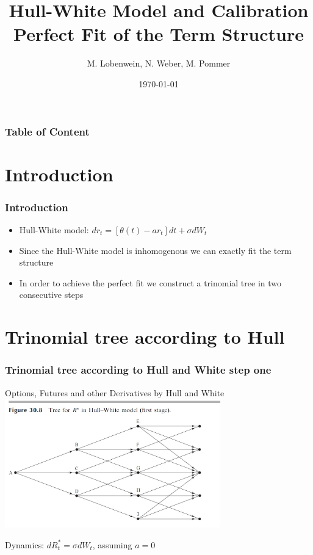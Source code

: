 \documentclass{beamer}
\begin{document}
\title[Hull-White model and calibration]{Hull-White Model and Calibration\\
Perfect Fit of the Term Structure}  



\date{\today} 
\author{M. Lobenwein, N. Weber, M. Pommer}



\begin{frame}
\titlepage
\end{frame} 


\begin{frame}
\frametitle[Table of Content]{Table of Content}
\vspace{0.4cm}
\tableofcontents
\end{frame} 


\section{Introduction} 
\begin{frame}
\frametitle{Introduction} 
\begin{itemize}
\item Hull-White model: $dr_t = [\theta(t)-ar_t]dt + \sigma dW_t$
\item Since the Hull-White model is inhomogenous we can exactly fit the term structure
\item In order to achieve the perfect fit we construct a trinomial tree in two consecutive steps
\end{itemize}
\end{frame}


\section{Trinomial tree according to Hull} 
\begin{frame}
\frametitle{Trinomial tree according to Hull and White step one} 
\begin{block}{Options, Futures and other Derivatives by Hull and White}
\includegraphics[width=0.7\textwidth]{Trinomialbaum hull White step one}
\end{block}
Dynamics: $dR^*_t = \sigma dW_t$, assuming $a=0$

\end{frame}
\end{document}
